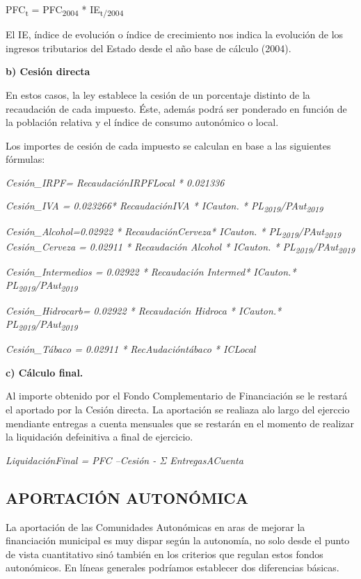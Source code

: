 \documentclass[
]{article}
\begin{document}
PFC\textsubscript{t} = PFC\textsubscript{2004} *
IE\textsubscript{t/2004}

El IE, índice de evolución o índice de crecimiento nos indica la
evolución de los ingresos tributarios del Estado desde el año base de
cálculo (2004).

\textbf{b) Cesión directa}

En estos casos, la ley establece la cesión de un porcentaje distinto de
la recaudación de cada impuesto. Éste, además podrá ser ponderado en
función de la población relativa y el índice de consumo autonómico o
local.

Los importes de cesión de cada impuesto se calculan en base a las
siguientes fórmulas:

\emph{Cesión\_IRPF= RecaudaciónIRPFLocal * 0.021336}

\emph{Cesión\_IVA = 0.023266* RecaudaciónIVA * ICauton. *
PL\textsubscript{2019}/PAut\textsubscript{2019}}

\emph{Cesión\_Alcohol=0.02922 * RecaudaciónCerveza* ICauton. *
PL\textsubscript{2019}/PAut\textsubscript{2019} Cesión\_Cerveza =
0.02911 * Recaudación Alcohol * ICauton. *
PL\textsubscript{2019}/PAut\textsubscript{2019}}

\emph{Cesión\_Intermedios = 0.02922 * Recaudación Intermed* ICauton.*
PL\textsubscript{2019}/PAut\textsubscript{2019}}

\emph{Cesión\_Hidrocarb= 0.02922 * Recaudación Hidroca * ICauton.*
PL\textsubscript{2019}/PAut\textsubscript{2019}}

\emph{Cesión\_Tábaco = 0.02911 * RecAudacióntábaco * ICLocal}

\textbf{c) Cálculo final.}

Al importe obtenido por el Fondo Complementario de Financiación se le
restará el aportado por la Cesión directa. La aportación se realiaza alo
largo del ejerccio mendiante entregas a cuenta mensuales que se restarán
en el momento de realizar la liquidación defeinitiva a final de
ejercicio.

\emph{LiquidaciónFinal = PFC --Cesión - Σ EntregasACuenta}

\hypertarget{aportaciuxf3n-autonuxf3mica}{%
\subsection{APORTACIÓN AUTONÓMICA}\label{aportaciuxf3n-autonuxf3mica}}

La aportación de las Comunidades Autonómicas en aras de mejorar la
financiación municipal es muy dispar según la autonomía, no solo desde
el punto de vista cuantitativo sinó también en los criterios que regulan
estos fondos autonómicos. En líneas generales podríamos establecer dos
diferencias básicas.
\end{document}
